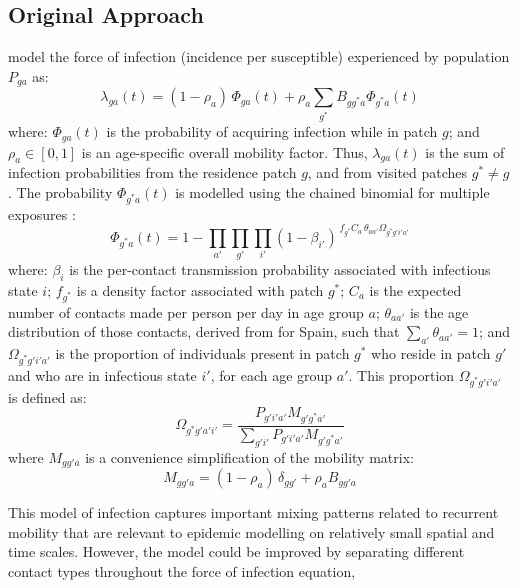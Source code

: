 \subsection{Original Approach}\label{meth.orig}
\citet{Arenas2020} model the force of infection (incidence per susceptible) experienced by population $P_{ga}$ as:
\begin{equation}\label{eq:Arenas.lambda}
  \lambda_{ga}(t) = (1-\rho_a)\,\Phi_{ga}(t) + \rho_a \sum_{g^*} B_{gg^*a} \Phi_{g^*a}(t)
\end{equation}
where:
$\Phi_{ga}(t)$ is the probability of acquiring infection while in patch $g$;
and $\rho_{a} \in [0,1]$ is an age-specific overall mobility factor.
Thus, $\lambda_{ga}(t)$ is the sum of infection probabilities
from the residence patch $g$, and from visited patches $g^* \ne g$.
The probability $\Phi_{g^*a}(t)$ is modelled using
the chained binomial for multiple exposures \cite{Kaplan1990}:
\begin{equation}\label{eq:Arenas.Phi}
  \Phi_{g^*a}(t) = 1 - \prod_{a'}\prod_{g'} \prod_{i'} {\left(1 - \beta_{i'}\right)}
    ^{\,f_{g^*}C_a\,\theta_{aa'} \Omega_{g^*g'i'a'}}
\end{equation}
where:
$\beta_i$ is the per-contact transmission probability associated with infectious state $i$;
$f_{g^*}$ is a density factor associated with patch $g^*$;
$C_a$ is the expected number of contacts made per person per day in age group $a$;
$\theta_{aa'}$ is the age distribution of those contacts, derived from \cite{Prem2017} for Spain,
such that $\sum_{a'} \theta_{aa'} = 1$;
and $\Omega_{g^*g'i'a'}$ is the proportion of individuals present in patch $g^*$
who reside in patch $g'$ and who are in infectious state $i'$, for each age group $a'$.
This proportion $\Omega_{g^*g'i'a'}$ is defined as:
\begin{equation}\label{eq:Arenas.Omega}
  \Omega_{g^*g'a'i'} = \frac{P_{g'i'a'} M_{g'g^*a'}}{\sum_{g'i'} P_{g'i'a'} M_{g'g^*a'}}
\end{equation}
where $M_{gg'a}$ is a convenience simplification of the mobility matrix:
\begin{equation}\label{eq:Arenas.M}
  M_{gg'a} = (1-\rho_a)\,\delta_{gg'} + \rho_a B_{gg'a}
\end{equation}
\par
This model of infection captures important mixing patterns related to recurrent mobility
that are relevant to epidemic modelling on relatively small spatial and time scales.
However, the model could be improved by
separating different contact types throughout the force of infection equation,
